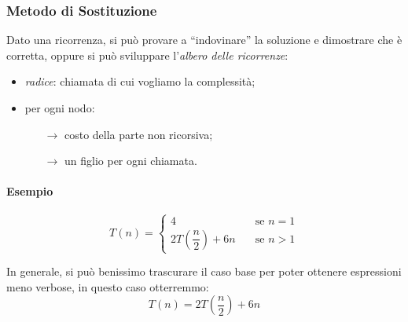 \subsubsection{Metodo di Sostituzione} \label{ricorrenze:sostituzione}
Dato una ricorrenza, si può provare a ``indovinare'' la soluzione e dimostrare che è corretta, oppure si può sviluppare l'\emph{albero %
delle ricorrenze}:
\begin{itemize}
	\item \emph{radice}: chiamata di cui vogliamo la complessità;
	\item per ogni nodo:
	\begin{itemize}
		\item[$\rightarrow$] costo della parte non ricorsiva;
		\item[$\rightarrow$] un figlio per ogni chiamata.
	\end{itemize}
\end{itemize}

\paragraph{Esempio} 

\[ T(n) =
\begin{cases}
4       & \quad \text{se } n = 1 \\
2T(\dfrac{n}{2})+ 6n  & \quad \text{se } n>1
\end{cases}
\]

In generale, si può benissimo trascurare il caso base per poter ottenere espressioni meno verbose, in questo 
caso otterremmo:
\begin{displaymath}
	T(n) = 2T(\frac{n}{2})+ 6n
\end{displaymath}

